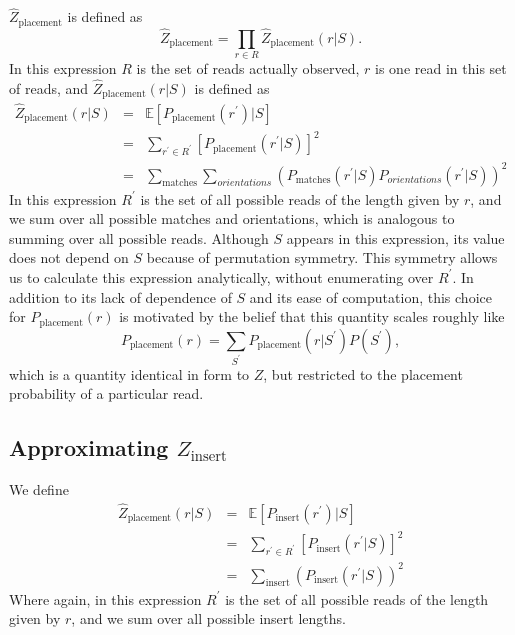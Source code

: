 \documentclass[phd,tocprelim]{cornell}
\begin{document}
$\hat{Z}_{\text{placement}}$ is defined as
\begin{equation}
    \hat{Z}_{\text{placement}} = \prod_{r \in R} \hat{Z}_{\text{placement}}(r|S).
\end{equation}
In this expression $R$ is the set of reads actually observed, $r$ is one read in this set of reads, and $\hat{Z}_{\text{placement}}(r|S)$ is defined as
\begin{equation}
    \begin{array}{lcl}
        \hat{Z}_{\text{placement}}(r|S) & = & \mathbb{E}\left[P_{\text{placement}}\left(r^{\prime}\right)|S\right] \\
        & = & \sum_{r^{\prime} \in R^{\prime}} \left[ P_{\text{placement}}(r^{\prime}|S)\right]^{2} \\
        & = & \sum_{\text{matches}} \sum_{orientations} \left(P_{\text{matches}}(r^{\prime}|S)P_{orientations}(r^{\prime}|S)\right)^{2}
    \end{array}
\end{equation}
In this expression $R^{\prime}$ is the set of all possible reads of the length given by $r$, and we sum over all possible matches and orientations, which is analogous to summing over all possible reads. Although $S$ appears in this expression, its value does not depend on $S$ because of permutation symmetry. This symmetry allows us to calculate this expression analytically, without enumerating over $R^{\prime}$.  In addition to its lack of dependence of $S$ and its ease of computation, this choice for $P_{\text{placement}}(r)$ is motivated by the belief that this quantity scales roughly like
\begin{equation}
    P_{\text{placement}}(r) = \sum_{S^{\prime}}P_{\text{placement}}(r|S^{\prime})P(S^{\prime}),
\end{equation}
which is a quantity identical in form to $Z$, but restricted to the placement probability of a particular read.


\subsection{Approximating $Z_{\text{insert}}$} %
\label{sub:Aprroximating Z_insert}

We define
\begin{equation}
    \begin{array}{lcl}
        \hat{Z}_{\text{placement}}(r|S) & = & \mathbb{E}\left[P_{\text{insert}}\left(r^{\prime}\right)|S\right] \\
        & = & \sum_{r^{\prime} \in R^{\prime}} \left[ P_{\text{insert}}(r^{\prime}|S)\right]^{2} \\
        & = & \sum_{\text{insert}} \left(P_{\text{insert}}(r^{\prime}|S)\right)^{2}
    \end{array}
\end{equation}
Where again, in this expression $R^{\prime}$ is the set of all possible reads of the length given by $r$, and we sum over all possible insert lengths.
\end{document}
